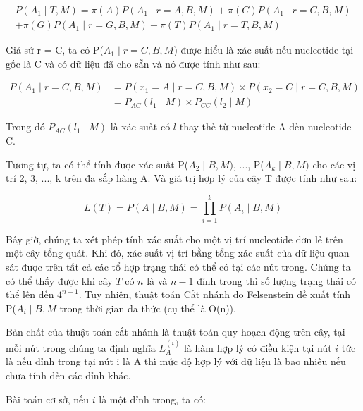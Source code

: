 \documentclass[12pt,a4paper]{report}
\begin{document}
\begin{multline}
    P(A_1 \mid T, M) = \pi(A) P(A_1 \mid r = A, B, M) + \pi(C) P(A_1 \mid r = C, B, M) \\
    + \pi(G) P(A_1 \mid r = G, B, M) + \pi(T) P(A_1 \mid r = T, B, M)
    \label{eq:placeholder_label}
\end{multline}

Giả sử r = C, ta có P(\(A_1 \mid r = C, B, M\)) được hiểu là xác suất nếu nucleotide tại gốc là C và có dữ liệu đã cho sẵn và nó được tính như sau:

\begin{equation}
\begin{split}
    P(A_{1} \mid r = C, B, M) &= P(x_{1} = A \mid r = C, B, M) \times P(x_{2} = C \mid r = C, B, M) \\
    &= P_{AC}(l_{1} \mid M) \times P_{CC}(l_{2} \mid M)
\end{split}
\label{eq:probability_split}
\end{equation}

Trong đó \(P_{AC}(l_{1} \mid M)\) là xác suất có \(l\) thay thế từ nucleotide A đến nucleotide C.

Tương tự, ta có thể tính được xác suất P(\(A_2 \mid B, M)\), ..., P(\(A_k \mid B, M)\) cho các vị trí 2, 3, ..., k trên đa sắp hàng A. Và giá trị hợp lý của cây T được tính như sau: 

\begin{equation}
    L(T) = P(A \mid B, M) = \prod_{i=1}^{k} P(A_{i} \mid B, M)
\end{equation}

Bây giờ, chúng ta xét phép tính xác suất cho một vị trí nucleotide đơn lẻ trên một cây tổng quát. Khi đó, xác suất vị trí bằng tổng xác suất của dữ liệu quan sát được trên tất cả các tổ hợp trạng thái có thể có tại các nút trong. Chúng ta có thể thấy được khi cây \(T\) có \(n\) là và \(n-1\) đỉnh trong thì số lượng trạng thái có thể lên đến $4^{n-1}$. Tuy nhiên, thuật toán Cắt nhánh do Felsenstein đề xuất tính P(\(A_i \mid B, M\) trong thời gian đa thức (cụ thể là O(n)). 

Bản chất của thuật toán cắt nhánh là thuật toán quy hoạch động trên cây, tại mỗi nút trong chúng ta định nghĩa $L_{A}^{(i)}$ là hàm hợp lý có điều kiện tại nút \(i\) tức là nếu đỉnh trong tại nút i là A thì mức độ hợp lý với dữ liệu là bao nhiêu nếu chưa tính đến các đỉnh khác.

Bài toán cơ sở, nếu \(i\) là một đỉnh trong, ta có:
\end{document}
